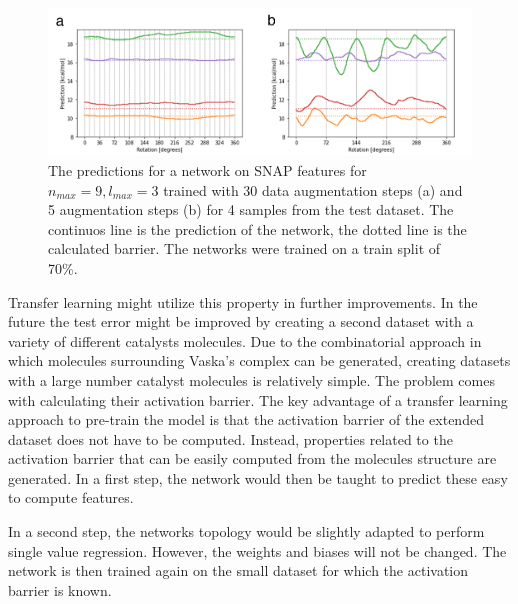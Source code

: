 \begin{figure}[H]
  \centering
  \includegraphics[width=1.0\textwidth]{figures/regression/snap/snap-rotation.png}
  \caption[Evaluation of SNAP rotational invariance]{
  The predictions for a network on SNAP features for $n_{max}=9, l_{max}=3$ trained with 30 data augmentation steps (a) 
  and 5 augmentation steps (b) for 4 samples from the test dataset.
  The continuos line is the prediction of the network, the dotted line is the calculated barrier.
  The networks were trained on a train split of 70\%.
  }
  \label{fig:snap_roation}

\end{figure}
Transfer learning might utilize this property in further improvements.
In the future the test error might be improved by creating a second dataset with a variety of different catalysts molecules.
Due to the combinatorial approach in which molecules surrounding Vaska's complex can be generated, 
creating datasets with a large number catalyst molecules is relatively simple.
The problem comes with calculating their activation barrier.
The key advantage of a transfer learning approach to pre-train the model is that the activation barrier of the extended dataset does not have to be computed.
Instead, properties related to the activation barrier that can be easily computed from the molecules structure are generated.
In a first step, the network would then be taught to predict these easy to compute features.

In a second step, the networks topology would be slightly adapted to perform single value regression.
However, the weights and biases will not be changed.
The network is then trained again on the small dataset for which the activation barrier is known.

